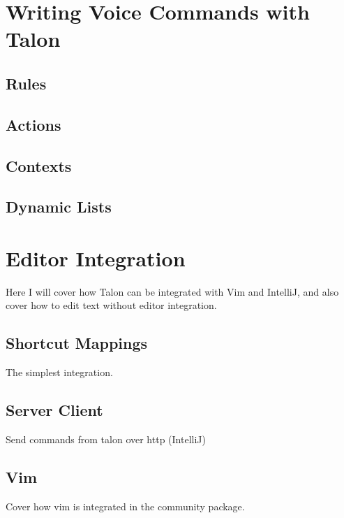 \documentclass[../thesis.tex]{subfiles}
\begin{document}
\section{Writing Voice Commands with Talon}\label{wvc}
\subsection{Rules}
\subsection{Actions}
\subsection{Contexts}
\subsection{Dynamic Lists}\label{dynamic_lists}

\section{Editor Integration}
Here I will cover how Talon can be integrated with Vim and IntelliJ, and also cover how to edit text without editor integration.
\subsection{Shortcut Mappings}
The simplest integration. 
\subsection{Server Client}
Send commands from talon over http (IntelliJ)
\subsection{Vim}
Cover how vim is integrated in the community package.
\end{document}
